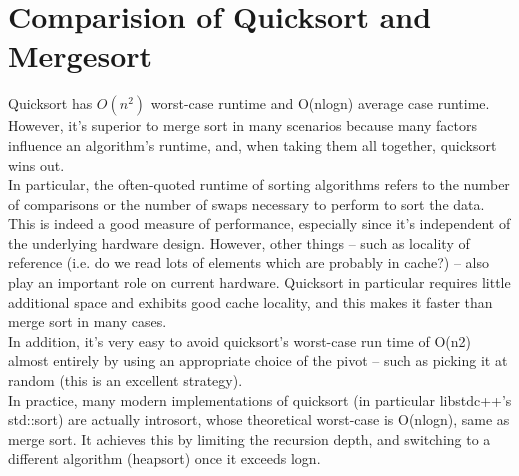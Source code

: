 \documentclass[a4paper,10pt]{article}
\begin{document}
\section*{Comparision of Quicksort and Mergesort}
    
    Quicksort has $O(n^2)$ worst-case runtime and O(nlogn) average case runtime. However, it’s superior to merge sort in many scenarios because many factors influence an algorithm’s runtime, and, when taking them all together, quicksort wins out.\\
    
    In particular, the often-quoted runtime of sorting algorithms refers to the number of comparisons or the number of swaps necessary to perform to sort the data. This is indeed a good measure of performance, especially since it’s independent of the underlying hardware design. However, other things – such as locality of reference (i.e. do we read lots of elements which are probably in cache?) – also play an important role on current hardware. Quicksort in particular requires little additional space and exhibits good cache locality, and this makes it faster than merge sort in many cases.\\
    
    In addition, it’s very easy to avoid quicksort’s worst-case run time of O(n2) almost entirely by using an appropriate choice of the pivot – such as picking it at random (this is an excellent strategy).\\
    
    In practice, many modern implementations of quicksort (in particular libstdc++’s std::sort) are actually introsort, whose theoretical worst-case is O(nlogn), same as merge sort. It achieves this by limiting the recursion depth, and switching to a different algorithm (heapsort) once it exceeds logn.
    
\end{document}
